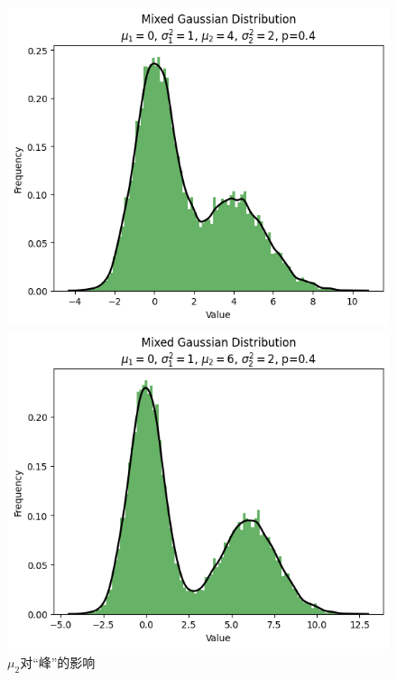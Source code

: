 \documentclass{article}
\begin{document}
\begin{figure}[H]
\begin{minipage}[b]{0.2\linewidth}
        \caption{$\mu_2=3$}
    \end{minipage}
    \hfill
    \begin{minipage}[b]{0.2\linewidth}
        \centering
        \includegraphics[width=\linewidth]{figure/mu_2=4.png}
        \caption{$\mu_2=4$}
    \end{minipage}
    \hfill
    \begin{minipage}[b]{0.2\linewidth}
        \centering
        \includegraphics[width=\linewidth]{figure/mu_2=6.png}
        \caption{$\mu_2=6$}
    \end{minipage}
    \caption{$\mu_2$对“峰”的影响}
    \label{fig:mu_2递增}
\end{figure}
\end{document}
